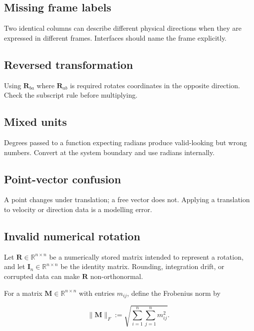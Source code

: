 \documentclass[
  australian,
  12pt,
  letterpaper,
  DIV=11,
  numbers=noendperiod,
  twoside]{scrreprt}
\begin{document}
\subsection{Missing frame labels}\label{missing-frame-labels}

Two identical columns can describe different physical directions when
they are expressed in different frames. Interfaces should name the frame
explicitly.

\subsection{Reversed transformation}\label{reversed-transformation}

Using \(\mathbf{R}_{ba}\) where \(\mathbf{R}_{ab}\) is required rotates
coordinates in the opposite direction. Check the subscript rule before
multiplying.

\subsection{Mixed units}\label{mixed-units}

Degrees passed to a function expecting radians produce valid-looking but
wrong numbers. Convert at the system boundary and use radians
internally.

\subsection{Point-vector confusion}\label{point-vector-confusion}

A point changes under translation; a free vector does not. Applying a
translation to velocity or direction data is a modelling error.

\subsection{Invalid numerical
rotation}\label{invalid-numerical-rotation}

Let \(\mathbf R\in\mathbb R^{n\times n}\) be a numerically stored matrix
intended to represent a rotation, and let
\(\mathbf I_n\in\mathbb R^{n\times n}\) be the identity matrix.
Rounding, integration drift, or corrupted data can make \(\mathbf R\)
non-orthonormal.

For a matrix \(\mathbf M\in\mathbb R^{n\times n}\) with entries
\(m_{ij}\), define the Frobenius norm by

\[
\lVert\mathbf M\rVert_F
\mathrel{:=}
\sqrt{\sum_{i=1}^{n}\sum_{j=1}^{n}m_{ij}^2}.
\]
\end{document}
